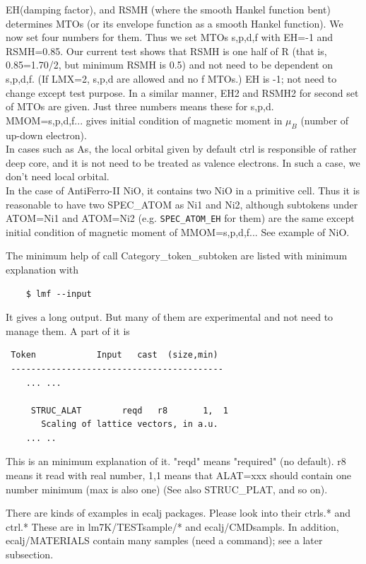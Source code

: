 \documentclass[a4paper,10pt,epsf,fleqn]{article}
\begin{document}
{\begin{itemize}
EH(damping factor), and RSMH (where the smooth Hankel function bent)
determines MTOs (or its envelope function as a smooth Hankel function). 
We now set four numbers for them. Thus we set MTOs
s,p,d,f with EH=-1 and RSMH=0.85. Our current test shows that RSMH is
one half of R (that is, 0.85=1.70/2, but minimum RSMH is 0.5) 
and not need to be dependent on s,p,d,f. (If LMX=2, s,p,d are allowed and no f MTOs.)
EH is -1; not need to change except test purpose.
In a similar manner, EH2 and RSMH2 for second set of MTOs are given.
Just three numbers means these for s,p,d. \\

MMOM=s,p,d,f... gives initial condition of magnetic moment in $\mu_B$
(number of up-down electron).\\

In cases such as As, the local orbital given by default ctrl
is responsible of rather deep core, and it is not need to be treated 
as valence electrons. In such a case,
we don't need local orbital.\\

In the case of AntiFerro-II NiO, it contains 
two NiO in a primitive cell. Thus it is reasonable to have two SPEC\_ATOM
as Ni1 and Ni2, although subtokens under
ATOM=Ni1 and ATOM=Ni2 (e.g. \verb+SPEC_ATOM_EH+ for them) are the same
except initial condition of magnetic moment of MMOM=s,p,d,f...
See example of NiO.
\end{itemize}

The minimum help of call Category\_token\_subtoken are listed with
minimum explanation with 
\begin{verbatim}
    $ lmf --input
\end{verbatim}
It gives a long output. But many of them are experimental and not need
to manage them. A part of it is
\begin{verbatim}
 Token            Input   cast  (size,min)
 ------------------------------------------
    ... ...

     STRUC_ALAT        reqd   r8       1,  1
       Scaling of lattice vectors, in a.u.
    ... ..
\end{verbatim}
This is an minimum explanation of it. "reqd" means "required" (no
default). r8 means it read with real number, 1,1 means
that ALAT=xxx should contain one number minimum (max is also one)
(See also STRUC\_PLAT, and so on).

There are kinds of examples in ecalj packages.
Please look into their ctrls.* and ctrl.*
These are in lm7K/TESTsample/* and ecalj/CMDsampls. 
In addition, ecalj/MATERIALS contain many samples
(need a command); see a later subsection.

}
\end{document}
